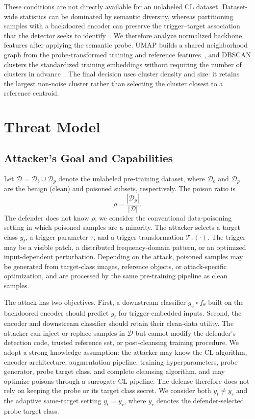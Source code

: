 \documentclass[10pt,journal]{IEEEtran}
\begin{document}
These conditions are not directly available for an unlabeled CL dataset. Dataset-wide statistics can be dominated by semantic diversity, whereas partitioning samples with a backdoored encoder can preserve the trigger--target association that the detector seeks to identify~\cite{Li2024Difficulty}. We therefore analyze normalized backbone features after applying the semantic probe. UMAP builds a shared neighborhood graph from the probe-transformed training and reference features~\cite{McInnes2018UMAP}, and DBSCAN clusters the standardized training embeddings without requiring the number of clusters in advance~\cite{Ester1996DBSCAN}. The final decision uses cluster density and size: it retains the largest non-noise cluster rather than selecting the cluster closest to a reference centroid.

\section{Threat Model}\label{sec:threatmodel}
\subsection{Attacker's Goal and Capabilities}
Let $\mathcal{D}=\mathcal{D}_{b}\cup\mathcal{D}_{p}$ denote the unlabeled pre-training dataset, where $\mathcal{D}_{b}$ and $\mathcal{D}_{p}$ are the benign (clean) and poisoned subsets, respectively. The poison ratio is
\begin{equation}
    \rho=\frac{|\mathcal{D}_{p}|}{|\mathcal{D}|}.
    \label{eq:poisoningratio}
\end{equation}
The defender does not know $\rho$; we consider the conventional data-poisoning setting in which poisoned samples are a minority. The attacker selects a target class $y_t$, a trigger parameter $\tau$, and a trigger transformation $\mathcal{T}_{\tau}(\cdot)$. The trigger may be a visible patch, a distributed frequency-domain pattern, or an optimized input-dependent perturbation. Depending on the attack, poisoned samples may be generated from target-class images, reference objects, or attack-specific optimization, and are processed by the same pre-training pipeline as clean samples.

The attack has two objectives. First, a downstream classifier $g_{\phi}\circ f_{\theta}$ built on the backdoored encoder should predict $y_t$ for trigger-embedded inputs. Second, the encoder and downstream classifier should retain their clean-data utility. The attacker can inject or replace samples in $\mathcal{D}$ but cannot modify the defender's detection code, trusted reference set, or post-cleansing training procedure. We adopt a strong knowledge assumption: the attacker may know the CL algorithm, encoder architecture, augmentation pipeline, training hyperparameters, probe generator, probe target class, and complete cleansing algorithm, and may optimize poisons through a surrogate CL pipeline. The defense therefore does not rely on keeping the probe or its target class secret. We consider both $y_t\neq y_r$ and the adaptive same-target setting $y_t=y_r$, where $y_r$ denotes the defender-selected probe target class.
\end{document}
